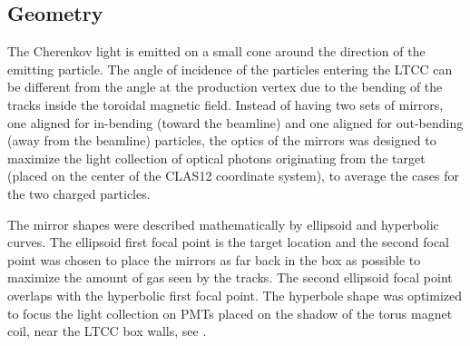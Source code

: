 \subsection{Geometry}

The Cherenkov light is emitted on a small cone around the direction of the emitting particle. The angle of
incidence of the particles entering the LTCC can be different from the angle at the production vertex due
to the bending of the tracks inside the toroidal magnetic field.
Instead of having two sets of mirrors, one aligned for in-bending (toward the beamline) and one aligned for
out-bending (away from the beamline) particles, the optics of the mirrors was designed to maximize the
light collection of optical photons originating from the target (placed on the center of the CLAS12 coordinate system),
to average the cases for the two charged particles.

The mirror shapes were described mathematically by ellipsoid and hyperbolic curves.
The ellipsoid first focal point is the target location and the second focal point was chosen
to place the mirrors as far back in the box as possible to maximize the amount of gas seen by the tracks.
The second ellipsoid focal point overlaps with the hyperbolic first focal point. The hyperbole shape was optimized to focus the light
collection on PMTs placed on the shadow of the torus magnet coil, near the LTCC box walls, see .


